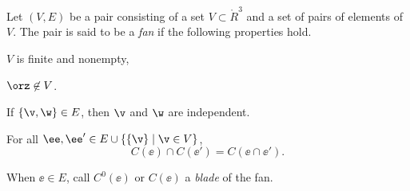 \begin{definition}  
Let $(V,E)$ be a pair consisting of a set $V\subset \ring{R}^3$ and a set of pairs of elements of $V$.  The pair is said to be
a {\it fan\/} if the following properties hold.
    \begin{nomerate}
    \item {} $V$ is finite and  nonempty,
    \item {} $\orz\not\in V$.
    \item {} If $\{\v,\w\} \in E$, then $\v$ and $\w$ are independent.
    \item {}
    For all $\ee ,\ee '\in E \cup \{\{\v\}\mid \v\in V\}$, 
 $$C(\ee )\cap C(\ee ') = C(\ee \cap \ee ').$$
    \end{nomerate}
When $\ee\in E$, call $C^0(\ee)$ or $C(\ee)$ a {\it blade\/} of the fan.
\end{definition}
%
%
%
%
%
%
\bigskip\hbox{~}\bigskip



